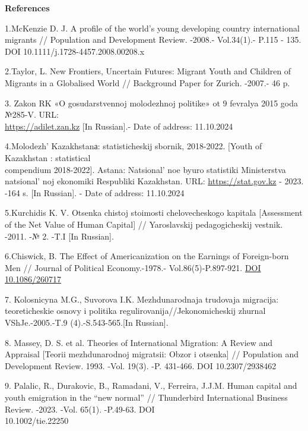 \begin{center}
{\bfseries References}
\end{center}

\begin{references}
1.McKenzie D. J. A profile of the world's young developing country
international migrants // Population and Development Review. -2008.-
Vol.34(1).- P.115 - 135. DOI 10.1111/j.1728-4457.2008.00208.x

2.Taylor, L. New Frontiers, Uncertain Futures: Migrant Youth and
Children of Migrants in a Globalised World // Background Paper for
Zurich. -2007.- 46 p.

3. Zakon RK «O gosudarstvennoj molodezhnoj politike» ot 9 fevralya 2015
goda №285-V. URL: \\\href{https://adilet.zan.kz/rus/docs/Z1500000285}{https://adilet.zan.kz} {[}In
Russian{]}.- Date of address: 11.10.2024

4.Molodezh'{} Kazakhstanа: statisticheskij sbornik,
2018-2022. {[}Youth of Kazakhstan : statistical \\compendium 2018-2022{]}.
Astana: Natsional' noe byuro statistiki Ministerstva
natsional' noj ekonomiki Respubliki Kazakhstan. URL:
\href{https://stat.gov.kz/api/iblock/element/184021/file/ru/}{https://stat.gov.kz} - 2023. -164 s.
{[}In Russian{]}. - Date of address: 11.10.2024

5.Kurchidis K. V. Otsenka chistoj stoimosti chelovecheskogo kapitala
{[}Assessment of the Net Value of Human Capital{]} // Yaroslavskij
pedagogicheskij vestnik. -2011. -№ 2. -T.I {[}In Russian{]}.

6.Chiswick, B. The Effect of Americanization on the Earnings of
Foreign-born Men // Journal of Political Economy.-1978.-
Vol.86(5)-P.897-921.
\href{https://econpapers.repec.org/scripts/redir.pf?u=http\%3A\%2F\%2Fdx.doi.org\%2F10.1086\%2F260717;h=repec:ucp:jpolec:v:86:y:1978:i:5:p:897-921}{DOI
10.1086/260717}~

7. Kolosnicyna M.G., Suvorova I.K. Mezhdunarodnaja trudovaja migracija:
teoreticheskie osnovy i politika regulirovanija//Jekonomicheskij zhurnal
VShJe.-2005.-T.9 (4).-S.543-565.{[}In Russian{]}.

8. Massey, D. S. et al. Theories of International Migration: A Review
and Appraisal {[}Teorii mezhdunarodnoj migratsii: Obzor i otsenka{]} //
Population and Development Review. 1993. -Vol. 19(3). -P. 431-466. DOI
10.2307/2938462

9. Palalic, R., Durakovic, B., Ramadani, V., Ferreira, J.J.M. Human
capital and youth emigration in the ``new normal'' // Thunderbird
International Business Review. -2023. -Vol. 65(1). -P.49-63. DOI\\
10.1002/tie.22250


\end{references}
